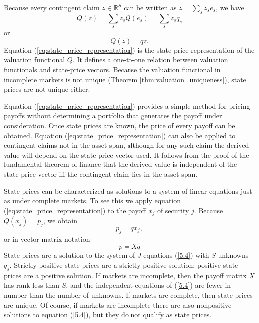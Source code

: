 \documentclass[\topdir/lecture\_notes.tex]{subfiles}
\begin{document}
Because every contingent claim $z \in \mathbb{R}^{S}$ can be written as $z=\sum_{s} z_{s} e_{s}$, we have
\begin{equation}
Q(z)=\sum_{s} z_{s} Q(e_{s})=\sum_{s} z_{s} q_{s} 
\end{equation}
or
\begin{equation}
Q(z)=q z. \label{eq:state_price_representation} 
\end{equation}
Equation (\ref{eq:state_price_representation}) is the state-price representation of the valuation functional $Q$. It defines a one-to-one relation between valuation functionals and state-price vectors. Because the valuation functional in incomplete markets is not unique (Theorem \ref{thm:valuation_uniqueness}), state prices are not unique either.

Equation (\ref{eq:state_price_representation}) provides a simple method for pricing payoffs without determining a portfolio that generates the payoff under consideration. Once state prices are known, the price of every payoff can be obtained. Equation (\ref{eq:state_price_representation}) can also be applied to contingent claims not in the asset span, although for any such claim the derived value will depend on the state-price vector used. It follows from the proof of the fundamental theorem of finance that the derived value is independent of the state-price vector iff the contingent claim lies in the asset span.

State prices can be characterized as solutions to a system of linear equations just as under complete markets. To see this we apply equation (\ref{eq:state_price_representation}) to the payoff $x_{j}$ of security $j$. Because $Q(x_{j})=p_{j}$, we obtain
\begin{equation}
p_{j}=q x_{j}, \label{5.2}
\end{equation}
or in vector-matrix notation
\begin{equation}
p=X q \label{5.4}
\end{equation}
State prices are a solution to the system of $J$ equations (\ref{5.4}) with $S$ unknowns $q_{s}$. Strictly positive state prices are a strictly positive solution; positive state prices are a positive solution. If markets are incomplete, then the payoff matrix $X$ has rank less than $S$, and the independent equations of (\ref{5.4}) are fewer in number than the number of unknowns. If markets are complete, then state prices are unique. Of course, if markets are incomplete there are also nonpositive solutions to equation (\ref{5.4}), but they do not qualify as state prices.
\end{document}
